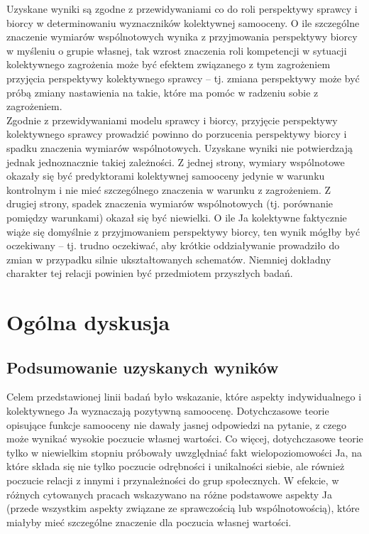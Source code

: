 \documentclass[man]{apa6}
\begin{document}
Uzyskane wyniki są zgodne z przewidywaniami co do roli perspektywy sprawcy i biorcy w determinowaniu wyznaczników kolektywnej samooceny. O ile szczególne znaczenie wymiarów wspólnotowych wynika z przyjmowania perspektywy biorcy w myśleniu o grupie własnej, tak wzrost znaczenia roli kompetencji w sytuacji kolektywnego zagrożenia może być efektem związanego z tym zagrożeniem przyjęcia perspektywy kolektywnego sprawcy -- tj. zmiana perspektywy może być próbą zmiany nastawienia na takie, które ma pomóc w radzeniu sobie z zagrożeniem.\\

Zgodnie z przewidywaniami modelu sprawcy i biorcy, przyjęcie perspektywy kolektywnego sprawcy prowadzić powinno do porzucenia perspektywy biorcy i spadku znaczenia wymiarów wspólnotowych. Uzyskane wyniki nie potwierdzają jednak jednoznacznie takiej zależności. Z jednej strony, wymiary wspólnotowe okazały się być predyktorami kolektywnej samooceny jedynie w warunku kontrolnym i nie mieć szczególnego znaczenia w warunku z zagrożeniem. Z drugiej strony, spadek znaczenia wymiarów wspólnotowych (tj. porównanie pomiędzy warunkami) okazał się być niewielki. O ile Ja kolektywne faktycznie wiąże się domyślnie z przyjmowaniem perspektywy biorcy, ten wynik mógłby być oczekiwany -- tj. trudno oczekiwać, aby krótkie oddziaływanie prowadziło do zmian w przypadku silnie ukształtowanych schematów. Niemniej dokładny charakter tej relacji powinien być przedmiotem przyszłych badań. \\

\newpage
\section{Ogólna dyskusja}

\subsection{Podsumowanie uzyskanych wyników}

Celem przedstawionej linii badań było wskazanie, które aspekty indywidualnego i kolektywnego Ja wyznaczają pozytywną samoocenę. Dotychczasowe teorie opisujące funkcje samooceny \parencite[np.,][]{pyszczynski2004people, leary2000nature} nie dawały jasnej odpowiedzi na pytanie, z czego może wynikać wysokie poczucie własnej wartości. Co więcej, dotychczasowe teorie tylko w niewielkim stopniu próbowały uwzględniać fakt wielopoziomowości Ja, na które składa się nie tylko poczucie odrębności i unikalności siebie, ale również poczucie relacji z innymi i przynależności do grup społecznych. W efekcie, w różnych cytowanych pracach wskazywano na różne podstawowe aspekty Ja (przede wszystkim aspekty związane ze sprawczością lub wspólnotowością), które miałyby mieć szczególne znaczenie dla poczucia własnej wartości.\\
\end{document}
